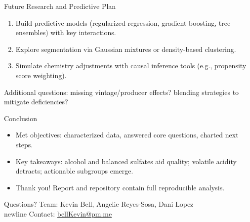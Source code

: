 \documentclass[aspectratio=169]{beamer}
\begin{document}
\begin{frame}{Future Research and Predictive Plan}
  \begin{enumerate}
    \item Build predictive models (regularized regression, gradient boosting, tree ensembles) with key interactions.
    \item Explore segmentation via Gaussian mixtures or density-based clustering.
    \item Simulate chemistry adjustments with causal inference tools (e.g., propensity score weighting).
  \end{enumerate}
  \vspace{0.5em}
  \small Additional questions: missing vintage/producer effects? blending strategies to mitigate deficiencies?
\end{frame}

\begin{frame}{Conclusion}
  \begin{itemize}
    \item Met objectives: characterized data, answered core questions, charted next steps.
    \item Key takeaways: alcohol and balanced sulfates aid quality; volatile acidity detracts; actionable subgroups emerge.
    \item Thank you! Report and repository contain full reproducible analysis.
  \end{itemize}
\end{frame}

\begin{frame}[standout]
  Questions?\newline
  \small Team: Kevin Bell, Angelie Reyes-Sosa, Dani Lopez\\newline
  Contact: \href{mailto:bellKevin@pm.me}{bellKevin@pm.me}
\end{frame}
\end{document}
